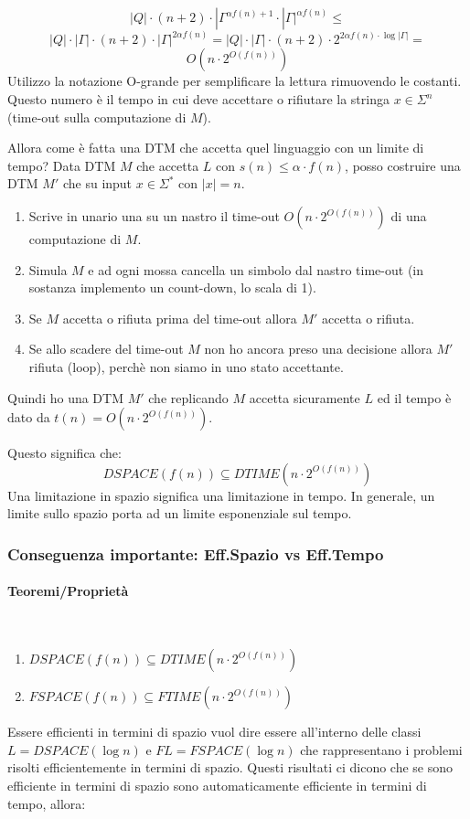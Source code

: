 \documentclass{article}
\begin{document}
$$|Q|\cdot(n+2)\cdot|\Gamma^{\alpha f(n)+1}\cdot|\Gamma|^{\alpha f(n)}\leq$$
$$|Q|\cdot|\Gamma|\cdot(n+2)\cdot|\Gamma|^{2\alpha f(n)}=|Q|\cdot|\Gamma|\cdot(n+2)\cdot2^{2\alpha f(n)\cdot\log |\Gamma|}=$$
$$O(n\cdot 2^{O(f(n))})$$
Utilizzo la notazione O-grande per semplificare la lettura rimuovendo le costanti. Questo numero è
il tempo in cui deve accettare o rifiutare la stringa $x\in\Sigma^n$ (time-out sulla computazione di $M$).

Allora come è fatta una DTM che accetta quel linguaggio con un limite di tempo? Data DTM $M$ che accetta
$L$ con $s(n)\leq\alpha\cdot f(n)$, posso costruire una DTM $M'$ che su input $x\in\Sigma^*$ con $|x|=n$.
\begin{enumerate}
    \item Scrive in unario una su un nastro il time-out $O(n\cdot 2^{O(f(n))})$ di una computazione di $M$.
    \item Simula $M$ e ad ogni mossa cancella un simbolo dal nastro time-out (in
          sostanza implemento un count-down, lo scala di 1).
    \item Se $M$ accetta o rifiuta prima del time-out allora $M'$ accetta o rifiuta.
    \item Se allo scadere del time-out $M$ non ho ancora preso una decisione allora $M'$ rifiuta (loop),
          perchè non siamo in uno stato accettante.
\end{enumerate}
Quindi ho una DTM $M'$ che replicando $M$ accetta sicuramente $L$ ed il tempo è
dato da $t(n)=O(n\cdot 2^{O(f(n))})$.

Questo significa che:
$$DSPACE(f(n))\subseteq DTIME(n\cdot 2^{O(f(n))})$$
Una limitazione in spazio significa una limitazione in tempo. In generale, un limite sullo spazio porta
ad un limite esponenziale sul tempo.

\subsubsection{Conseguenza importante: Eff.Spazio vs Eff.Tempo}
\paragraph{Teoremi/Proprietà}\mbox{}\\
\begin{enumerate}
    \item $DSPACE(f(n))\subseteq DTIME(n\cdot 2^{O(f(n))})$
    \item $FSPACE(f(n))\subseteq FTIME(n\cdot 2^{O(f(n))})$
\end{enumerate}
Essere efficienti in termini di spazio vuol dire essere all'interno delle classi
$L=DSPACE(\log n)$ e $FL=FSPACE(\log n)$ che
rappresentano i problemi risolti efficientemente in termini di spazio.
Questi risultati ci dicono che se sono efficiente in termini di spazio sono automaticamente
efficiente in termini di tempo, allora:
\end{document}

